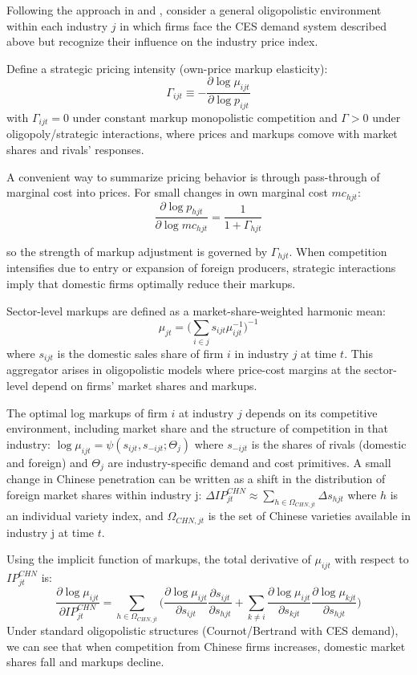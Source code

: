 \documentclass[12pt]{article}
\begin{document}
Following the approach in \textcite{edmondCompetitionMarkupsGains2015} and \textcite{amitiInternationalShocksVariable2019}, consider a general oligopolistic environment within each industry $j$ in which firms face the CES demand system described above but recognize their influence on the industry price index.

Define a strategic pricing intensity (own-price markup elasticity): $$\Gamma_{ijt} \equiv - \frac{\partial \log \mu_{ijt}}{\partial \log p_{ijt}}$$with $\Gamma_{ijt} = 0$ under constant markup monopolistic competition and $\Gamma>0$ under oligopoly/strategic interactions, where prices and markups comove with market shares and rivals' responses.

A convenient way to summarize pricing behavior is through pass-through of marginal cost into prices. For small changes in own marginal cost $mc_{hjt}$: 
\[
\frac{\partial \log p_{hjt}}{\partial \log mc_{hjt}} = \frac{1}{1+\Gamma_{hjt}}
\]

so the strength of markup adjustment is governed by $\Gamma_{hjt}$. When competition intensifies due to entry or expansion of foreign producers, strategic interactions imply that domestic firms optimally reduce their markups.

Sector-level markups are defined as a market-share-weighted harmonic mean: 
\[
\mu_{jt} = \bigg(\sum_{i\in j} s_{ijt}\mu_{ijt}^{-1} \bigg)^{-1}
\]
where $s_{ijt}$ is the domestic sales share of firm $i$ in industry $j$ at time $t$. This aggregator arises in oligopolistic models where price-cost margins at the sector-level depend on firms' market shares and markups. 

The optimal log markups of firm $i$ at industry $j$ depends on its competitive environment, including market share and the structure of competition in that industry: $\log \mu_{ijt} = \psi(s_{ijt}, s_{-ijt}; \Theta_{j})$ where $s_{-ijt}$ is the shares of rivals (domestic and foreign) and $\Theta_j$ are industry-specific demand and cost primitives. A small change in Chinese penetration can be written as a shift in the distribution of foreign market shares within industry j: $\Delta IP^{CHN}_{jt} \approx \sum_{h\in \Omega_{CHN,jt}} \Delta s_{hjt}$ where $h$ is an individual variety index, and $\Omega_{CHN,jt}$ is the set of Chinese varieties available in industry j at time $t$.

Using the implicit function of markups, the total derivative of $\mu_{ijt}$ with respect to $IP^{CHN}_{jt}$ is: 
\[
\frac{\partial \log \mu_{ijt}}{\partial IP_{jt}^{CHN}} = \sum_{h \in \Omega_{CHN,jt}} \bigg(\frac{\partial \log \mu_{ijt}}{\partial s_{ijt}} \frac{\partial s_{ijt}}{\partial s_{hjt}} + \sum_{k \neq i} \frac{\partial \log \mu_{ijt}}{\partial s_{kjt}} \frac{\partial \log \mu_{kjt}}{\partial s_{hjt}} \bigg)
\]
Under standard oligopolistic structures (Cournot/Bertrand with CES demand), we can see that when competition from Chinese firms increases, domestic market shares fall and markups decline. 
\end{document}
